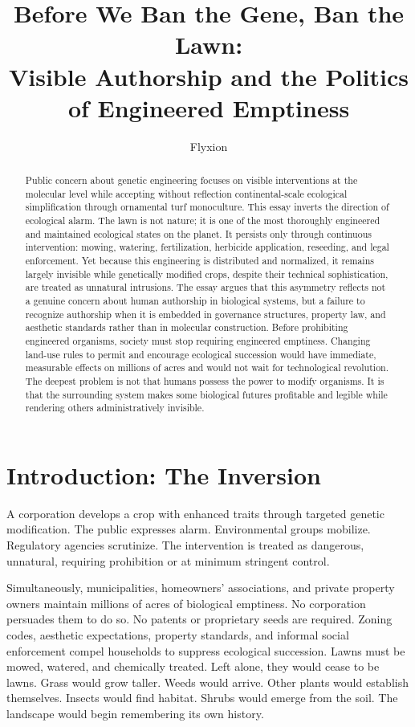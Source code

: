 \documentclass[12pt]{article}
\title{Before We Ban the Gene, Ban the Lawn: \\Visible Authorship and the Politics of Engineered Emptiness}
\author{Flyxion}
\date{}
\begin{document}
\maketitle

\begin{abstract}

Public concern about genetic engineering focuses on visible interventions at the molecular level while accepting without reflection continental-scale ecological simplification through ornamental turf monoculture. This essay inverts the direction of ecological alarm. The lawn is not nature; it is one of the most thoroughly engineered and maintained ecological states on the planet. It persists only through continuous intervention: mowing, watering, fertilization, herbicide application, reseeding, and legal enforcement. Yet because this engineering is distributed and normalized, it remains largely invisible while genetically modified crops, despite their technical sophistication, are treated as unnatural intrusions. The essay argues that this asymmetry reflects not a genuine concern about human authorship in biological systems, but a failure to recognize authorship when it is embedded in governance structures, property law, and aesthetic standards rather than in molecular construction. Before prohibiting engineered organisms, society must stop requiring engineered emptiness. Changing land-use rules to permit and encourage ecological succession would have immediate, measurable effects on millions of acres and would not wait for technological revolution. The deepest problem is not that humans possess the power to modify organisms. It is that the surrounding system makes some biological futures profitable and legible while rendering others administratively invisible.

\end{abstract}

\section{Introduction: The Inversion}

A corporation develops a crop with enhanced traits through targeted genetic modification. The public expresses alarm. Environmental groups mobilize. Regulatory agencies scrutinize. The intervention is treated as dangerous, unnatural, requiring prohibition or at minimum stringent control.

Simultaneously, municipalities, homeowners' associations, and private property owners maintain millions of acres of biological emptiness. No corporation persuades them to do so. No patents or proprietary seeds are required. Zoning codes, aesthetic expectations, property standards, and informal social enforcement compel households to suppress ecological succession. Lawns must be mowed, watered, and chemically treated. Left alone, they would cease to be lawns. Grass would grow taller. Weeds would arrive. Other plants would establish themselves. Insects would find habitat. Shrubs would emerge from the soil. The landscape would begin remembering its own history.
\end{document}
